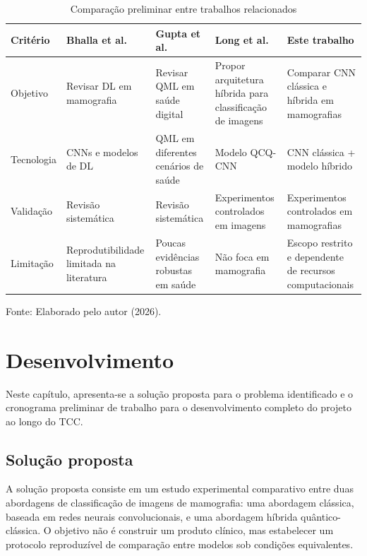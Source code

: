 \documentclass[
    12pt,
    openright,
    oneside,
    a4paper,
    english,
    brazil
]{abntex2}
\begin{document}
\begin{table}[H]
    \centering
    \caption{Comparação preliminar entre trabalhos relacionados}
    \label{tab:comparacao_trabalhos}
    \small
    \begin{tabular}{p{2.2cm} p{2.5cm} p{2.5cm} p{2.5cm} p{2.7cm}}
        \toprule
        \textbf{Critério} & \textbf{Bhalla et al.} & \textbf{Gupta et al.} & \textbf{Long et al.} & \textbf{Este trabalho} \\
        \midrule
        Objetivo & Revisar DL em mamografia & Revisar QML em saúde digital & Propor arquitetura híbrida para classificação de imagens & Comparar CNN clássica e híbrida em mamografias \\
        Tecnologia & CNNs e modelos de DL & QML em diferentes cenários de saúde & Modelo QCQ-CNN & CNN clássica + modelo híbrido \\
        Validação & Revisão sistemática & Revisão sistemática & Experimentos controlados em imagens & Experimentos controlados em mamografias \\
        Limitação & Reprodutibilidade limitada na literatura & Poucas evidências robustas em saúde & Não foca em mamografia & Escopo restrito e dependente de recursos computacionais \\
        \bottomrule
    \end{tabular}
    \par\vspace{0.2cm}\small Fonte: Elaborado pelo autor (2026).
\end{table}

\chapter{Desenvolvimento}
\label{cap:desenvolvimento}

Neste capítulo, apresenta-se a solução proposta para o problema identificado e o cronograma preliminar de trabalho para o desenvolvimento completo do projeto ao longo do TCC.

\section{Solução proposta}
\label{sec:solucao}

A solução proposta consiste em um estudo experimental comparativo entre duas abordagens de classificação de imagens de mamografia: uma abordagem clássica, baseada em redes neurais convolucionais, e uma abordagem híbrida quântico-clássica. O objetivo não é construir um produto clínico, mas estabelecer um protocolo reproduzível de comparação entre modelos sob condições equivalentes.
\end{document}

